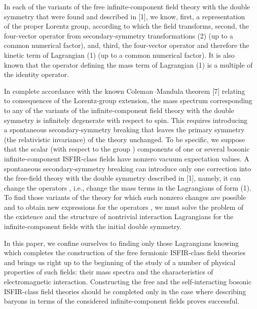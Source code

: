\documentclass[a4paper,12pt]{article}
\begin{document}
In each of the variants of the free infinite-component field theory with the
double symmetry that were found and described in [1], we know, first, a
representation of the proper Lorentz group, according to which the field
transforms, second, the four-vector operator \coordHE{} from secondary-symmetry
transformations (2) (up to a common numerical factor), and, third, the
four-vector operator \myHighlight{$\Gamma^{\mu}$}\coordHE{} and therefore the kinetic term of
Lagrangian (1) (up to a common numerical factor). It is also known that the
operator \coordHE{} defining the mass term of Lagrangian (1) is a multiple of the
identity operator.

In complete accordance with the known Coleman--Mandula theorem [7] relating to
consequences of the Lorentz-group extension, the mass spectrum corresponding
to any of the variants of the infinite-component field theory with the double
symmetry is infinitely degenerate with respect to spin. This requires
introducing a spontaneous secondary-symmetry breaking that leaves the primary
symmetry (the relativistic invariance) of the theory unchanged. To be specific,
we suppose that the scalar (with respect to the group \coordHE{})
components of one or several bosonic infinite-component ISFIR-class fields have
nonzero vacuum expectation values. A spontaneous secondary-symmetry breaking 
can introduce only one correction into the free-field theory with the double 
symmetry described in [1], namely, it can change the operators \coordHE{}, i.e.,
change the mass terms in the Lagrangians of form (1). To find those variants of
the theory for which such nonzero changes are possible and to obtain new
expressions for the operators \coordHE{}, we must solve the problem of the existence
and the structure of nontrivial interaction Lagrangians for the
infinite-component fields with the initial double symmetry.

In this paper, we confine ourselves to finding only those Lagrangians knowing
which completes the construction of the free fermionic ISFIR-class field
theories and brings us right up to the beginning of the study of a number of
physical properties of such fields: their mass spectra and the characteristics
of electromagnetic interaction. Constructing the free and the self-interacting
bosonic ISFIR-class field theories should be completed only in the case where
describing baryons in terms of the considered infinite-component fields proves
successful.
\end{document}
